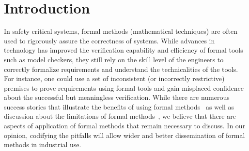 \section{Introduction}
\label{sec:intro}

 
In safety critical systems, formal methods (mathematical techniques) are often used to rigorously assure the correctness of systems. %
While advances in technology has improved the verification capability and efficiency of formal tools such as model checkers, they still rely on the skill level of the engineers to correctly formalize requirements
and understand the technicalities of the tools. For instance, one could use a set of inconsistent (or incorrectly restrictive) premises to prove requirements using formal tools and gain misplaced confidence about the successful but meaningless verification. While there are numerous success stories that illustrate the benefits of using formal methods~\cite{Miller03:shalls,Whalen07:FMICS} as well as discussion about the limitations of formal methods~\cite{kneuper1997limits,hall1990seven}, we believe that there are aspects of application of formal methods that remain necessary to discuss. %
In our opinion, codifying the pitfalls will allow wider and better dissemination of formal methods in industrial use.

